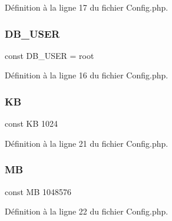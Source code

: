 Définition à la ligne 17 du fichier Config.\+php.

\mbox{\label{_config_8php_a1d1d99f8e08f387d84fe9848f3357156}} 
\subsubsection{\texorpdfstring{D\+B\+\_\+\+U\+S\+ER}{DB\_USER}}
{\footnotesize\ttfamily const D\+B\+\_\+\+U\+S\+ER = \textquotesingle{}root\textquotesingle{}}



Définition à la ligne 16 du fichier Config.\+php.

\mbox{\label{_config_8php_a4f06cdd0c63f3ce691804d6c90ea6c32}} 
\subsubsection{\texorpdfstring{KB}{KB}}
{\footnotesize\ttfamily const KB 1024}



Définition à la ligne 21 du fichier Config.\+php.

\mbox{\label{_config_8php_a91c734126e699a6ba53fe57e06bb8b49}} 
\subsubsection{\texorpdfstring{MB}{MB}}
{\footnotesize\ttfamily const MB 1048576}



Définition à la ligne 22 du fichier Config.\+php.

